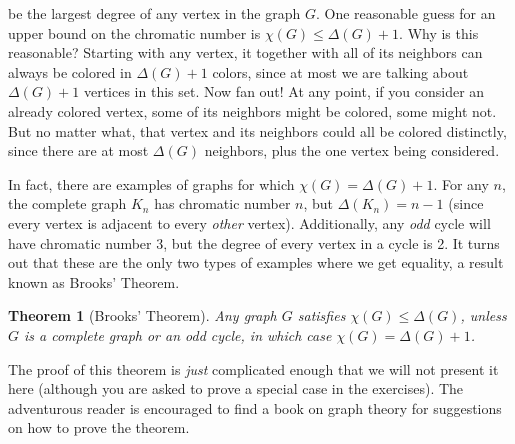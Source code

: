 \documentclass[10pt,]{book}
\theoremstyle{plain}
\newtheorem{theorem}{Theorem}[section]
\theoremstyle{definition}
\theoremstyle{definition}
\theoremstyle{definition}
\theoremstyle{definition}
\numberwithin{equation}{chapter}
\begin{document}
 be the largest degree of any vertex in the graph \(G\). One reasonable guess for an upper bound on the chromatic number is \(\chi(G) \le \Delta(G) + 1\). Why is this reasonable? Starting with any vertex, it together with all of its neighbors can always be colored in \(\Delta(G) + 1\) colors, since at most we are talking about \(\Delta(G) + 1\) vertices in this set. Now fan out! At any point, if you consider an already colored vertex, some of its neighbors might be colored, some might not. But no matter what, that vertex and its neighbors could all be colored distinctly, since there are at most \(\Delta(G)\) neighbors, plus the one vertex being considered.%
\par
\hypertarget{p-334}{}%
In fact, there are examples of graphs for which \(\chi(G) = \Delta(G) + 1\). For any \(n\), the complete graph \(K_n\) has chromatic number \(n\), but \(\Delta(K_n) = n-1\) (since every vertex is adjacent to every \emph{other} vertex). Additionally, any \emph{odd} cycle will have chromatic number 3, but the degree of every vertex in a cycle is 2. It turns out that these are the only two types of examples where we get equality, a result known as Brooks' Theorem.%
\begin{theorem}[{Brooks' Theorem}]\label{theorem-8}
\hypertarget{p-335}{}%
 Any graph \(G\) satisfies \(\chi(G) \le \Delta(G)\), unless \(G\) is a complete graph or an odd cycle, in which case \(\chi(G) = \Delta(G) + 1\).%
\end{theorem}
\hypertarget{p-336}{}%
The proof of this theorem is \emph{just} complicated enough that we will not present it here (although you are asked to prove a special case in the exercises). The adventurous reader is encouraged to find a book on graph theory for suggestions on how to prove the theorem.%
\typeout{************************************************}
\typeout{************************************************}
\end{document}
